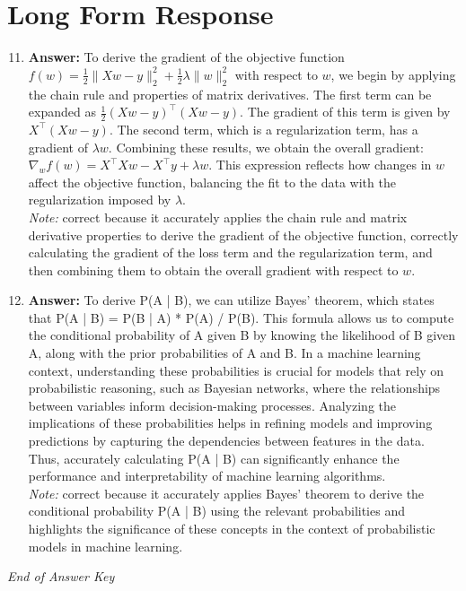 \documentclass[12pt]{article}
\begin{document}
\section*{Long Form Response}
\begin{enumerate}[label=\arabic*.]
\setcounter{enumi}{10}
\item \textbf{Answer:} To derive the gradient of the objective function \( f(w) = \frac{1}{2} \|Xw - y\|_2^2 + \frac{1}{2}\lambda \|w\|_2^2 \) with respect to \( w \), we begin by applying the chain rule and properties of matrix derivatives. The first term can be expanded as \( \frac{1}{2} (Xw - y)^\top (Xw - y) \). The gradient of this term is given by \( X^\top (Xw - y) \). The second term, which is a regularization term, has a gradient of \( \lambda w \). Combining these results, we obtain the overall gradient: \( \nabla_w f(w) = X^\top X w - X^\top y + \lambda w \). This expression reflects how changes in \( w \) affect the objective function, balancing the fit to the data with the regularization imposed by \( \lambda \).
\\ \textit{Note:} correct because it accurately applies the chain rule and matrix derivative properties to derive the gradient of the objective function, correctly calculating the gradient of the loss term and the regularization term, and then combining them to obtain the overall gradient with respect to \( w \).
\item \textbf{Answer:} To derive P(A | B), we can utilize Bayes' theorem, which states that P(A | B) = P(B | A) * P(A) / P(B). This formula allows us to compute the conditional probability of A given B by knowing the likelihood of B given A, along with the prior probabilities of A and B. In a machine learning context, understanding these probabilities is crucial for models that rely on probabilistic reasoning, such as Bayesian networks, where the relationships between variables inform decision-making processes. Analyzing the implications of these probabilities helps in refining models and improving predictions by capturing the dependencies between features in the data. Thus, accurately calculating P(A | B) can significantly enhance the performance and interpretability of machine learning algorithms.
\\ \textit{Note:} correct because it accurately applies Bayes' theorem to derive the conditional probability P(A | B) using the relevant probabilities and highlights the significance of these concepts in the context of probabilistic models in machine learning.
\end{enumerate}

\vfill
\noindent\textit{End of Answer Key}
\end{document}
